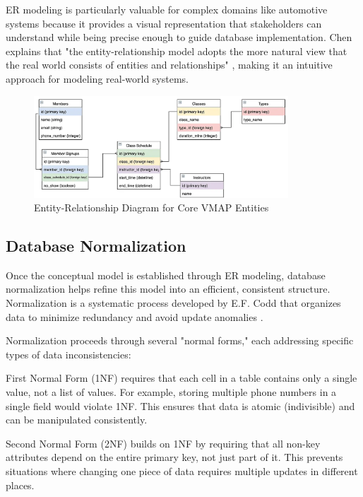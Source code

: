ER modeling is particularly valuable for complex domains like automotive systems because it provides a visual representation that stakeholders can understand while being precise enough to guide database implementation. Chen explains that "the entity-relationship model adopts the more natural view that the real world consists of entities and relationships" \cite{chen1976entity}, making it an intuitive approach for modeling real-world systems.

\begin{figure}[ht]
    \centering
    \includegraphics[width=0.85\textwidth]{figures/er_diagram.png}
    \caption{Entity-Relationship Diagram for Core VMAP Entities \cite{RelationalData}}
    \label{fig:er-diagram}
\end{figure}

\subsection{Database Normalization}
\label{subsec:database-normalization}

Once the conceptual model is established through ER modeling, database normalization helps refine this model into an efficient, consistent structure. Normalization is a systematic process developed by E.F. Codd that organizes data to minimize redundancy and avoid update anomalies \cite{codd1970relational}.

Normalization proceeds through several "normal forms," each addressing specific types of data inconsistencies:

First Normal Form (1NF) requires that each cell in a table contains only a single value, not a list of values. For example, storing multiple phone numbers in a single field would violate 1NF. This ensures that data is atomic (indivisible) and can be manipulated consistently.

Second Normal Form (2NF) builds on 1NF by requiring that all non-key attributes depend on the entire primary key, not just part of it. This prevents situations where changing one piece of data requires multiple updates in different places.

